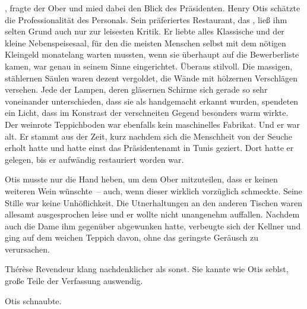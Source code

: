 , fragte der Ober und mied dabei den Blick des Präsidenten.
Henry Otis schätzte die Professionalität des Personals.
Sein präferiertes Restaurant, das , ließ ihm selten Grund auch nur zur leisesten Kritik.
Er liebte alles Klassische und der kleine Nebenspeisesaal, für den die meisten Menschen selbst mit dem nötigen Kleingeld monatelang warten mussten, wenn sie überhaupt auf die Bewerberliste kamen, war genau in seinem Sinne eingerichtet.
Überaus stilvoll.
Die massigen, stählernen Säulen waren dezent vergoldet, die Wände mit hölzernen Verschlägen versehen.
Jede der Lampen, deren gläsernen Schirme sich gerade so sehr voneinander unterschieden, dass sie als handgemacht erkannt wurden, spendeten ein Licht, dass im Konstrast der verschneiten Gegend besonders warm wirkte.
Der weinrote Teppichboden war ebenfalls kein maschinelles Fabrikat.
Und er war alt.
Er stammt aus der Zeit, kurz nachdem sich die Menschheit von der Seuche erholt hatte und hatte einst das Präsidentenamt in Tunis geziert.
Dort hatte er gelegen, bis er aufwändig restauriert worden war.

\par

Otis musste nur die Hand heben, um dem Ober mitzuteilen, dass er keinen weiteren Wein wünschte~-- auch, wenn dieser wirklich vorzüglich schmeckte.
Seine Stille war keine Unhöflichkeit.
Die Utnerhaltungen an den anderen Tischen waren allesamt ausgesprochen leise und er wollte nicht unangenehm auffallen.
Nachdem auch die Dame ihm gegenüber abgewunken hatte, verbeugte sich der Kellner und ging auf dem weichen Teppich davon, ohne das geringste Geräusch zu verursachen.

\par

Thérèse Revendeur klang nachdenklicher als sonst.
Sie kannte wie Otis seblst, große Teile der Verfassung auswendig.

\par

Otis schnaubte.

